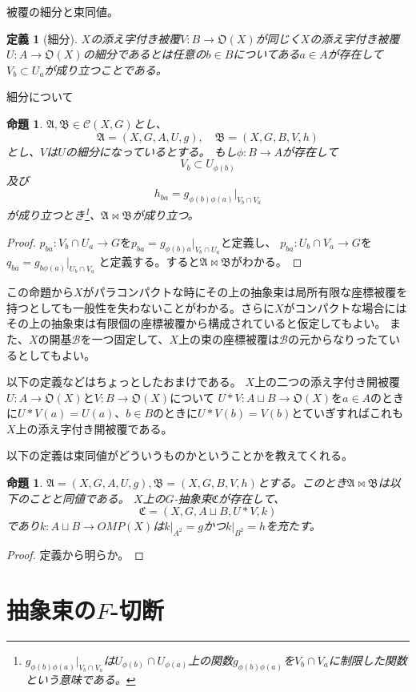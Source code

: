 \documentclass[leqno]{jsarticle}
\newtheorem{prop}[thm]{命題}
\newtheorem{df}[thm]{定義}
\begin{document}
被覆の細分と束同値。
\begin{df}[細分]
$X$の添え字付き被覆$V:B\to \mathfrak{O}(X)$が同じく$X$の添え字付き被覆$U:A\to \mathfrak{O}(X)$の細分であるとは任意の$b\in B$についてある$a\in A$が存在して$V_b\subset U_a$が成り立つことである。
\end{df}
細分について
\begin{prop}
$\mathfrak{A}, \mathfrak{B}\in \mathscr{C}(X,G)$とし、
\[
\mathfrak{A}=(X, G, A, U, g), \quad \mathfrak{B}=(X, G, B, V, h)
\]
とし、$V$は$U$の細分になっているとする。
もし$\phi:B\to A$が存在して
\[
V_{b}\subset U_{\phi(b)}
\]
及び
\[
h_{ba}=g_{\phi(b)\phi(a)}|_{V_b\cap V_a}
\]
が成り立つとき\footnote{$g_{\phi(b)\phi(a)}|_{V_b\cap V_a}$は$U_{\phi(b)}\cap U_{\phi(a)}$上の関数$g_{\phi(b)\phi(a)}$を$V_b\cap V_a$に制限した関数という意味である。}、$\mathfrak{A}\bowtie \mathfrak{B}$が成り立つ。
\end{prop}
\begin{proof}
$p_{ba}:V_b\cap U_a\to G$を$p_{ba}=g_{\phi(b)a}|_{V_b\cap U_a}$と定義し、
$p_{ba}:U_b\cap V_a\to G$を$q_{ba}=g_{b\phi(a)}|_{U_b\cap V_a}$
と定義する。すると$\mathfrak{A}\bowtie \mathfrak{B}$がわかる。
\end{proof}
この命題から$X$がパラコンパクトな時にその上の抽象束は局所有限な座標被覆を持つとしても一般性を失わないことがわかる。さらに$X$がコンパクトな場合にはその上の抽象束は有限個の座標被覆から構成されていると仮定してもよい。
また、$X$の開基$\mathcal{B}$を一つ固定して、$X$上の束の座標被覆は$\mathcal{B}$の元からなりったているとしてもよい。
\par
以下の定義などはちょっとしたおまけである。
$X$上の二つの添え字付き開被覆$U:A\to \mathfrak{O}(X)$と$V:B\to \mathfrak{O}(X)$について
$U*V:A\sqcup B\to \mathfrak{O}(X)$を$a\in A$のときに$U*V(a)=U(a)$、$b\in B$のときに$U*V(b)=V(b)$とていぎすればこれも$X$上の添え字付き開被覆である。
\par
以下の定義は束同値がどういうものかということかを教えてくれる。
\begin{prop}
$\mathfrak{A}=(X, G, A, U, g), \mathfrak{B}=(X, G, B, V, h)$とする。このとき$\mathfrak{A}\bowtie \mathfrak{B}$は以下のことと同値である。
$X$上の$G$-抽象束$\mathfrak{C}$が存在して、
\[
\mathfrak{C}=(X, G, A\sqcup B, U*V, k)
\]
であり$k:A\sqcup B\to OMP(X)$は$k|_{A^2}=g$かつ$k|_{B^2}=h$を充たす。
\end{prop}
\begin{proof}
定義から明らか。
\end{proof}
\section{抽象束の$F$-切断}
\end{document}
